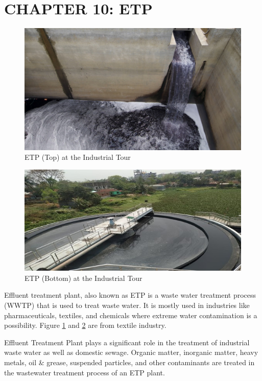 \section{CHAPTER 10: ETP\cite{etp}}
\begin{figure}[h!]
    \centering
    \includegraphics[width=1\linewidth]{figs/etp.jpg}
    \caption{ETP (Top) at the Industrial Tour}
    \label{fig:etp}
\end{figure}

\begin{figure}[h!]
    \centering
    \includegraphics[width=1\linewidth]{figs/etp2.jpg}
    \caption{ETP (Bottom) at the Industrial Tour}
    \label{fig:etp2}
\end{figure}

Effluent treatment plant, also known as ETP is a waste water treatment process (WWTP) that is used to treat waste water. It is mostly used in industries like pharmaceuticals, textiles, and chemicals where extreme water contamination is a possibility. Figure \ref{fig:etp} and \ref{fig:etp2} are from textile industry.

Effluent Treatment Plant plays a significant role in the treatment of industrial waste water as well as domestic sewage. Organic matter, inorganic matter, heavy metals, oil \& grease, suspended particles, and other contaminants are treated in the wastewater treatment process of an ETP plant. 

